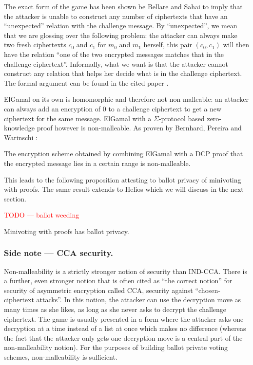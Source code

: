 \documentclass[envcountsame]{llncs}
\begin{document}
The exact form of the game has been shown be Bellare and Sahai \cite{BS99} to
imply that the attacker is unable to construct any number of ciphertexts that
have an ``unexpected'' relation with the challenge message. By ``unexpected'',
we mean that we are glossing over the following problem: the attacker can
always make two fresh ciphertexts $c_0$ and $c_1$ for $m_0$ and $m_1$ herself,
this pair $(c_0, c_1)$ will then have the relation ``one of the two encrypted
messages matches that in the challenge ciphertext''. Informally, what we want is
that the attacker cannot construct any relation that helps her decide what is in
the challenge ciphertext. The formal argument can be found in the cited paper
\cite{BS99}.

ElGamal on its own is homomorphic and therefore not non-malleable: an attacker
can always add an encryption of $0$ to a challenge ciphertext to get a new
ciphertext for the same message. ElGamal with a $\Sigma$-protocol based
zero-knowledge proof however is non-malleable. As proven by Bernhard, Pereira
and Warinschi \cite{BPW12b}:

\begin{proposition}
The encryption scheme obtained by combining ElGamal with a DCP proof that the
encrypted message lies in a certain range is non-malleable.
\end{proposition}

This leads to the following proposition attesting to ballot privacy of
minivoting with proofs. The same result extends to Helios which we will discuss
in the next section.

\textcolor{red}{TODO --- ballot weeding}

\begin{proposition}
Minivoting with proofs has ballot privacy.
\end{proposition}

\subsubsection{Side note --- CCA security.}
Non-malleability is a strictly stronger notion of security than IND-CCA.
There is a further, even stronger notion that is often cited as ``the correct
notion'' for security of asymmetric encryption called CCA, security against
``chosen-ciphertext attacks''. In this notion, the attacker can use the
decryption move as many times as she likes, as long as she never asks to
decrypt the challenge ciphertext. The game is usually presented in a form where
the attacker asks one decryption at a time instead of a list at once which makes
no difference (whereas the fact that the attacker only gets one decryption move
is a central part of the non-malleability notion). For the purposes of building
ballot private voting schemes, non-malleability is sufficient.
\end{document}
